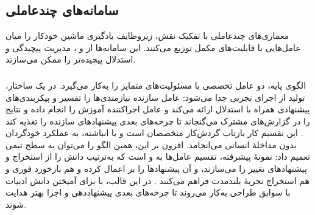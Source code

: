 \subsection{سامانه‌های چندعاملی}

معماری‌های چندعاملی با تفکیک نقش، زیروظایف یادگیری ماشین خودکار را میان عامل‌هایی با قابلیت‌های مکمل توزیع می‌کنند. این سامانه‌ها از  و ، مدیریت پیچیدگی و استدلال پیچیده‌تر را ممکن می‌سازند.

\subsubsection{\protect{}}
الگوی پایه، دو عامل تخصصی با مسئولیت‌های متمایز را به‌کار می‌گیرد. در یک ساختار، تولید  از اجرای تجربی جدا می‌شود: عامل سازنده نیازمندی‌ها را تفسیر و پیکربندی‌های پیشنهادی همراه با استدلال ارائه می‌کند و عامل اجراکننده آموزش را انجام داده و نتایج را در گزارش‌های مشترک می‌گنجاند تا چرخه‌های بعدی پیشنهادهای سازنده را تغذیه کند \cite{liu2025agenthpo}. این تقسیم کار بازتاب گردش‌کار متخصصان است و با  انباشته، به عملکرد خودگردان بدون مداخلهٔ انسانی می‌انجامد. افزون بر این، همین الگو را می‌توان به سطح تیمی تعمیم داد: نمونهٔ پیشرفته، تقسیم عامل‌ها به  و  است که به‌ترتیب دانش را از  استخراج و پیشنهادهای تغییر را می‌سازند، و آن پیشنهادها را بر  اعمال کرده و هم بازخورد فوری و هم استخراج تجربهٔ بلندمدت فراهم می‌کنند \cite{Yang2025NADER}. در این قالب،  با  برای آمیختن دانش ادبیات با سوابق طراحی به‌کار می‌روند تا چرخه‌های بعدی پیشنهاددهی و اجرا بهتر هدایت شوند.

